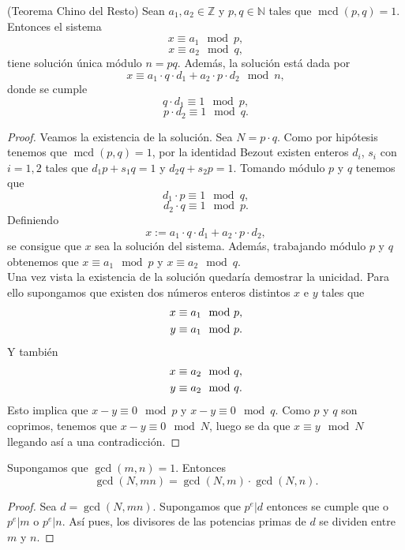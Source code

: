 \begin{teorema}
		(Teorema Chino del Resto) Sean $a_1, a_2\in \mathbb{Z}$ y $p,q \in \mathbb{N}$ tales que $\operatorname{mcd}(p,q) = 1$. Entonces el sistema
		$$
			x\equiv a_1 \mod p,
		$$\vspace*{-8mm}
		$$
			x\equiv a_2 \mod q,
		$$
	tiene solución única módulo $n=pq$. Además, la solución está dada por
	$$
		x\equiv a_1\cdot q\cdot d_1 +a_2\cdot p\cdot d_2 \mod n,
	$$
	donde se cumple
	$$
		q\cdot d_1 \equiv 1 \mod p,
	$$\vspace*{-7mm}
	$$
		p\cdot d_2 \equiv 1 \mod q.
	$$
\end{teorema}
\begin{proof}
		Veamos la existencia de la solución. Sea $N=p\cdot q$. Como por hipótesis tenemos que $\operatorname{mcd}(p,q)=1$, por la identidad Bezout existen enteros $d_i$, $s_i$ con $i=1,2$ tales que $d_1p+s_1q=1$ y $d_2q+s_2p=1$. Tomando módulo $p$ y $q$ tenemos que 
	$$
		d_1\cdot p \equiv 1 \mod q,
	$$\vspace*{-7mm}
	$$
		d_2\cdot q \equiv 1 \mod p.
	$$
	Definiendo 
	$$
		x :=  a_1\cdot q\cdot d_1 +a_2\cdot p\cdot d_2,
	$$
	se consigue que $x$ sea la solución del sistema. Además, trabajando módulo $p$ y $q$ obtenemos que $x\equiv a_1 \mod p$ y $x\equiv a_2 \mod q$.\\
	Una vez vista la existencia de la solución quedaría demostrar la unicidad. Para ello supongamos que existen dos números enteros distintos $x$ e $y$ tales que 
		\begin{equation}
			\begin{split}
				x \equiv a_1 \mod p,\notag\\
				y \equiv a_1 \mod p.\notag
			\end{split}
		\end{equation}
	Y también 
		\begin{equation}
			\begin{split}
				x \equiv a_2 \mod q,\notag\\
				y \equiv a_2 \mod q.\notag
			\end{split}
		\end{equation}
	Esto implica que $x-y\equiv0 \mod p$ y $x-y\equiv0 \mod q$. Como $p$ y $q$ son coprimos, tenemos que $x-y\equiv 0 \mod N$, luego se da que $x\equiv y \mod N$ llegando así a una contradicción. \qedhere
\end{proof}

\begin{proposicion}
		Supongamos que $\operatorname{gcd}(m,n)=1$. Entonces
		$$
			\operatorname{gcd}(N, mn)=\operatorname{gcd}(N,m)\cdot\operatorname{gcd}(N,n).
		$$
\end{proposicion}
\begin{proof}
		Sea $d=\operatorname{gcd}(N,mn)$. Supongamos que $p^e|d$ entonces se cumple que o $p^e|m$ o $p^e|n$. Así pues, los divisores de las potencias primas de $d$ se dividen entre $m$ y $n$.
\end{proof}\\

